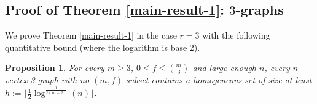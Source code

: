 \documentclass[11pt]{article}
\theoremstyle{plain}
\newtheorem{proposition}[theorem]{Proposition}
\begin{document}

\subsection{Proof of Theorem \ref{main-result-1}: $3$-graphs} \label{subsec:3-graphs}

We prove Theorem \ref{main-result-1} in the case $r=3$ with the following quantitative bound (where the logarithm is base 2).

\begin{proposition} \label{3-graphs}
    For every $m \geq 3$, $0 \leq f \leq \binom{m}{3}$ and large enough $n$, every $n$-vertex 3-graph with no $(m,f)$-subset contains a homogeneous set of size at least 
    $h := \big\lfloor \frac{1}{2}\log^{\frac{1}{2(m-2)}}(n) \big\rfloor$.
\end{proposition}
\end{document}
